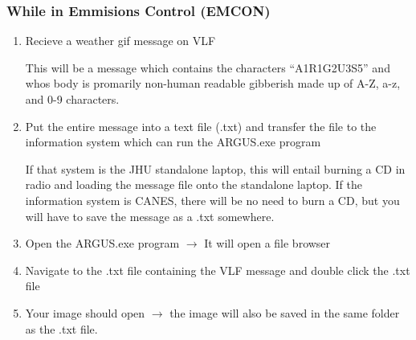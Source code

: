 \subsubsection{While in Emmisions Control (EMCON)}
\begin{enumerate}
    \item Recieve a weather gif message on VLF
    \begin{addnote} This will be a message which contains the characters ``A1R1G2U3S5'' and whos body is promarily non-human readable gibberish made up of A-Z, a-z, and 0-9 characters.\end{addnote}
    \item Put the entire message into a text file (.txt) and transfer the file to the information system which can run the ARGUS.exe program
    \begin{addnote} If that system is the JHU standalone laptop, this will entail burning a CD in radio and loading the message file onto the standalone laptop.  If the information system is CANES, there will be no need to burn a CD, but you will have to save the message as a .txt somewhere. \end{addnote}
    \item Open the ARGUS.exe program $\rightarrow$ It will open a file browser
    \item Navigate to the .txt file containing the VLF message and double click the .txt file
    \item Your image should open $\rightarrow$ the image will also be saved in the same folder as the .txt file.
\end{enumerate}

